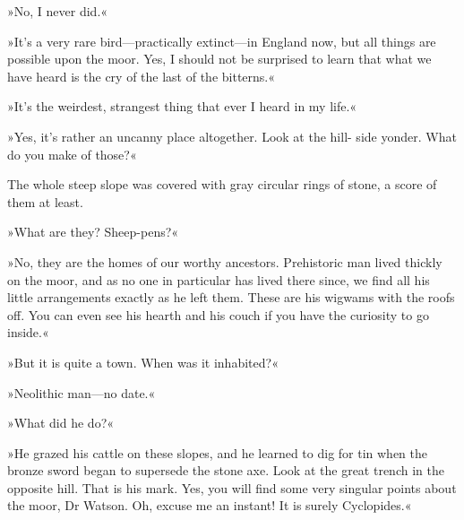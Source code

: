 »No, I never did.«


»It's a very rare bird—practically extinct—in England now, but all things are possible upon the moor. Yes, I should not be surprised to learn that what we have heard is the cry of the last of the bitterns.«


»It's the weirdest, strangest thing that ever I heard in my life.«

»Yes, it's rather an uncanny place altogether. Look at the hill- side yonder. What do you make of those?«

The whole steep slope was covered with gray circular rings of stone, a score of them at least.

»What are they? Sheep-pens?«

»No, they are the homes of our worthy ancestors. Prehistoric man lived thickly on the moor, and as no one in particular has lived there since, we find all his little arrangements exactly as he left them. These are his wigwams with the roofs off. You can even see his hearth and his couch if you have the curiosity to go inside.«

»But it is quite a town. When was it inhabited?«


»Neolithic man—no date.«

»What did he do?«


»He grazed his cattle on these slopes, and he learned to dig for tin when the bronze sword began to supersede the stone axe. Look at the great trench in the opposite hill. That is his mark. Yes, you will find some very singular points about the moor, Dr Watson. Oh, excuse me an instant! It is surely Cyclopides.«


